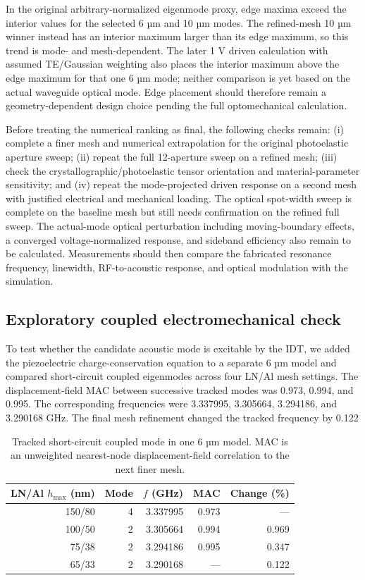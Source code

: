 \documentclass[10pt,twocolumn]{article}
\begin{document}
In the original arbitrary-normalized eigenmode proxy, edge maxima exceed the interior values for the selected 6 µm and 10 µm modes. The refined-mesh 10 µm winner instead has an interior maximum larger than its edge maximum, so this trend is mode- and mesh-dependent. The later 1 V driven calculation with assumed TE/Gaussian weighting also places the interior maximum above the edge maximum for that one 6 µm mode; neither comparison is yet based on the actual waveguide optical mode. Edge placement should therefore remain a geometry-dependent design choice pending the full optomechanical calculation.

Before treating the numerical ranking as final, the following checks remain: (i) complete a finer mesh and numerical extrapolation for the original photoelastic aperture sweep; (ii) repeat the full 12-aperture sweep on a refined mesh; (iii) check the crystallographic/photoelastic tensor orientation and material-parameter sensitivity; and (iv) repeat the mode-projected driven response on a second mesh with justified electrical and mechanical loading. The optical spot-width sweep is complete on the baseline mesh but still needs confirmation on the refined full sweep. The actual-mode optical perturbation including moving-boundary effects, a converged voltage-normalized response, and sideband efficiency also remain to be calculated. Measurements should then compare the fabricated resonance frequency, linewidth, RF-to-acoustic response, and optical modulation with the simulation.
\subsection{Exploratory coupled electromechanical check}
To test whether the candidate acoustic mode is excitable by the IDT, we added the piezoelectric charge-conservation equation to a separate 6 µm model and compared short-circuit coupled eigenmodes across four LN/Al mesh settings. The displacement-field MAC between successive tracked modes was 0.973, 0.994, and 0.995. The corresponding frequencies were 3.337995, 3.305664, 3.294186, and 3.290168 GHz. The final mesh refinement changed the tracked frequency by 0.122%
\begin{table}[t]\centering\small
\caption{Tracked short-circuit coupled mode in one 6 µm model. MAC is an unweighted nearest-node displacement-field correlation to the next finer mesh.}
\label{tab:coupled-mesh}
\begin{tabular}{@{}rrrrr@{}}\toprule
LN/Al $h_{\max}$ (nm) & Mode & $f$ (GHz) & MAC & Change (\%)\\\midrule
150/80 & 4 & 3.337995 & 0.973 & ---\\
100/50 & 2 & 3.305664 & 0.994 & 0.969\\
75/38 & 2 & 3.294186 & 0.995 & 0.347\\
65/33 & 2 & 3.290168 & --- & 0.122\\\bottomrule
\end{tabular}\end{table}
\end{document}

